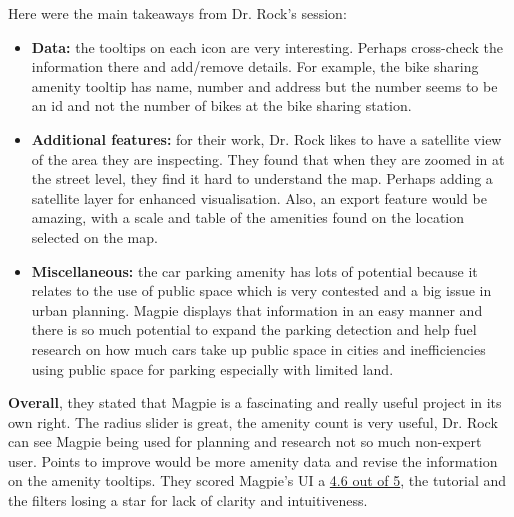 \newpage Here were the main takeaways from Dr. Rock's session:
\begin{itemize}
    \item \textbf{Data:} the tooltips on each icon are very interesting. Perhaps
    cross-check the information there and add/remove details. For example, the
    bike sharing amenity tooltip has name, number and address but the number
    seems to be an id and not the number of bikes at the bike sharing station.
    \vspace{0.2cm}

    \item \textbf{Additional features:} for their work, Dr. Rock likes to have a
    satellite view of the area they are inspecting. They found that when they
    are zoomed in at the street level, they find it hard to understand the map.
    Perhaps adding a satellite layer for enhanced visualisation. Also, an
    export feature would be amazing, with a scale and table of the amenities
    found on the location selected on the map.
    \vspace{0.2cm}

    \item \textbf{Miscellaneous:} the car parking amenity has lots of potential
    because it relates to the use of public space which is very contested and a
    big issue in urban planning. Magpie displays that information in an easy
    manner and there is so much potential to expand the parking detection and
    help fuel research on how much cars take up public space in cities and
    inefficiencies using public space for parking especially with limited land.

\end{itemize}

\textbf{Overall}, they stated that Magpie is a fascinating and really useful
project in its own right. The radius slider is great, the amenity count is very
useful, Dr. Rock can see Magpie being used for planning and research not so much
non-expert user. Points to improve would be more amenity data and revise the
information on the amenity tooltips. They scored Magpie's UI a \underline{4.6
out of 5}, the tutorial and the filters losing a star for lack of clarity and
intuitiveness.

